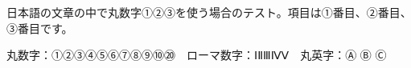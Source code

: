\documentclass{article}
\begin{document}
日本語の文章の中で丸数字①②③を使う場合のテスト。項目は①番目、②番目、③番目です。

丸数字：①②③④⑤⑥⑦⑧⑨⑩⑳　ローマ数字：ⅠⅡⅢⅣⅤ　丸英字：Ⓐ Ⓑ Ⓒ
\end{document}
